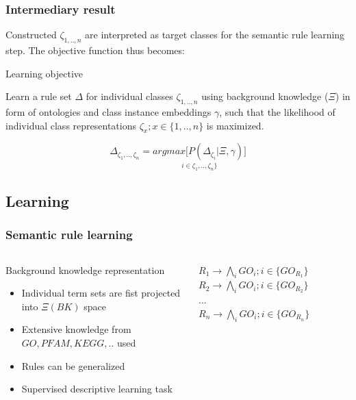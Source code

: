 \documentclass{beamer}
\begin{document}
\begin{frame}\frametitle{Intermediary result}

 Constructed $\zeta_{1,..,n}$  are interpreted as target classes for the semantic rule learning step. The objective function thus becomes:

  \begin{alertblock}{Learning objective}

    Learn a rule set $\Delta$  for individual classes $\zeta_{1,..,n}$ using background knowledge ($\Xi$) in form of ontologies and class instance embeddings $\gamma$, such that the likelihood of individual class representations $\zeta_{x};x \in \{1,..,n\}$ is maximized.

    \begin{equation}
      \Delta_{\zeta_{1},..,\zeta_{n}} = \underset{i \in \zeta_{1},..,\zeta_{n}\}}{argmax \Big[P(
        \Delta_{\zeta_{i}}|\Xi,\gamma) \Big]}
    \end{equation}
    
    \end{alertblock}
  
  \end{frame}
  \subsection{Learning}
  \begin{frame}\frametitle{Semantic rule learning}

      \begin{columns}
    \begin{column}{0.5\textwidth}

  \begin{block}{Background knowledge representation}
    \begin{itemize}

    \item Individual term sets are fist projected into $\Xi(BK)$ space
    \item Extensive knowledge from $GO,PFAM, KEGG,..$ used
    \item Rules can be generalized
    \item Supervised descriptive learning task
      
    \end{itemize}
  \end{block}
      \end{column}
      \begin{column}{0.5\textwidth}  %
      \begin{center}
        $R_{1} \rightarrow \bigwedge_{i}GO_{i}; i \in \{GO_{R_{1}}\}$
        $R_{2} \rightarrow \bigwedge_{i}GO_{i}; i \in \{GO_{R_{2}}\}$\\
        $...$\\
        \medskip
        $R_{n} \rightarrow \bigwedge_{i}GO_{i}; i \in \{GO_{R_{n}}\}$
      \end{center}
    \end{column}
    \end{columns}

  \end{frame}
\end{document}
